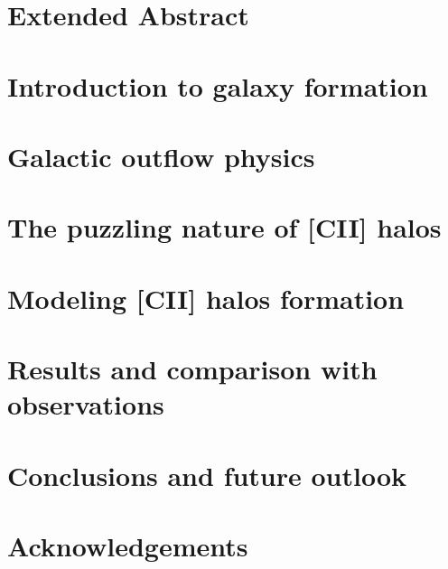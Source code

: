 \documentclass[a4paper, 12pt]{book}
\begin{document}







\chapter*{Extended Abstract}



\chapter{Introduction to galaxy formation} \label{chap:intro}
\vspace{20pt}


\chapter{Galactic outflow physics} \label{chap:outflows}
\vspace{20pt}


\chapter{The puzzling nature of [CII] halos} \label{chap:halos}
\vspace{20pt}



\chapter{Modeling [CII] halos formation} \label{chap:model}
\vspace{20pt}


\chapter{Results and comparison with observations} \label{chap:results}
\vspace{20pt}


\chapter{Conclusions and future outlook}
\vspace{20pt}
\label{chap:conclusion}



\chapter{Acknowledgements}
\vspace{20pt}
\label{chap:acknowledgements}





\end{document}
